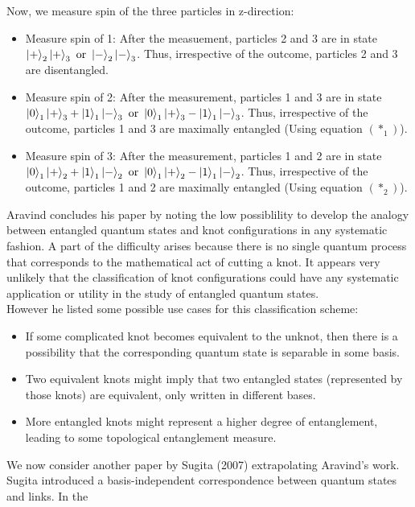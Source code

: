 \documentclass{scrartcl}
\begin{document}
Now, we measure spin of the three particles in z-direction:
\begin{itemize}

    \item Measure spin of 1: After the measuement, particles 2 and 3 are in state $\ket{+}_2\ket{+}_3 \text{ or }\ket{-}_2\ket{-}_3$. Thus, irrespective of the outcome, particles 2 and 3 are disentangled. 
    
    \item Measure spin of 2: After the measurement, particles 1 and 3 are in state $\ket{0}_1\ket{+}_3 +\ket{1}_1\ket{-}_3\text{ or } \ket{0}_1\ket{+}_3 -\ket{1}_1\ket{-}_3$. Thus, irrespective of the outcome, particles 1 and 3 are maximally entangled (Using equation $(*_1)$). 
    
    \item Measure spin of 3: After the measurement, particles 1 and 2 are in state $\ket{0}_1\ket{+}_2 +\ket{1}_1\ket{-}_2\text{ or }\ket{0}_1\ket{+}_2 -\ket{1}_1\ket{-}_2$. Thus, irrespective of the outcome, particles 1 and 2 are maximally entangled (Using equation $(*_2)$).
    
\end{itemize}
Aravind concludes his paper by noting the low possiblility to develop the analogy between entangled quantum states and knot configurations in any systematic fashion. A part of the difficulty arises because there is no single quantum process that corresponds to the mathematical act of cutting a knot. It appears very unlikely that the classification of knot configurations could have any systematic application or utility in the study of entangled quantum states.\\[0.3cm]
However he listed some possible use cases for this classification scheme:
\begin{itemize}
    \item If some complicated knot becomes equivalent to the unknot, then there is a possibility that the corresponding quantum state is separable in some basis.
    \item Two equivalent knots might imply that two entangled states (represented by those knots) are equivalent, only written in different bases.
    \item More entangled knots might represent a higher degree of entanglement, leading to some topological entanglement measure.
\end{itemize}
We now consider another paper by Sugita (2007) extrapolating Aravind's work. Sugita introduced a basis-independent correspondence between quantum states and links. In the
\end{document}
